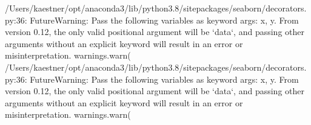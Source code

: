 \documentclass[letterpaper,10pt,english]{sphinxmanual}
\begin{document}
\begin{sphinxVerbatim}[commandchars=\\\{\}]
  
  
  
 
\end{sphinxVerbatim}

\begin{sphinxVerbatim}[commandchars=\\\{\}]
/Users/kaestner/opt/anaconda3/lib/python3.8/site\PYGZhy{}packages/seaborn/\PYGZus{}decorators.py:36: FutureWarning: Pass the following variables as keyword args: x, y. From version 0.12, the only valid positional argument will be `data`, and passing other arguments without an explicit keyword will result in an error or misinterpretation.
  warnings.warn(
/Users/kaestner/opt/anaconda3/lib/python3.8/site\PYGZhy{}packages/seaborn/\PYGZus{}decorators.py:36: FutureWarning: Pass the following variables as keyword args: x, y. From version 0.12, the only valid positional argument will be `data`, and passing other arguments without an explicit keyword will result in an error or misinterpretation.
  warnings.warn(
\end{sphinxVerbatim}

\noindent{}
\end{document}
